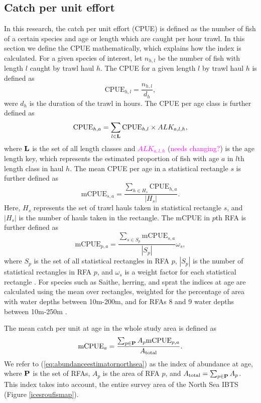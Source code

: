 \documentclass[a4paper 12pt]{article}
\numberwithin{equation}{section}
\newcommand{\natty}[1]{\textcolor{magenta}{#1}}
\begin{document}
\subsection{Catch per unit effort}
\label{sec:cpueestimators}
In this research, the catch per unit effort (CPUE) is defined as the number of fish of a certain species and age or length which are caught per hour trawl. In this section we define the CPUE mathematically, which explains how the index is calculated. For a given species of interest, let $n_{h,l}$ be the number of fish with length $l$ caught by trawl haul $h$. The CPUE for a given length $l$ by trawl haul $h$ is defined as 
\begin{equation}\label{eq:cpueHaul}
\mathrm{CPUE}_{h,l} =\frac{n_{h,l}}{d_h},
\end{equation}
were $d_h$ is the duration of the trawl in hours. The CPUE per age class is further defined as
\begin{equation}\label{eq:cpueALK}
\mathrm{CPUE}_{h,a} =\sum_{l \in {\bf L}}\mathrm{CPUE}_{h, l} \times ALK_{a,l,h},
\end{equation}
where ${\bf L}$ is the set of all length classes and \natty{$ALK_{a,l,h}$} (\natty{needs changing?}) is the age length key, which represents the estimated proportion of fish with age $a$ in $l$th length class in haul $h$. The mean CPUE per age in a statistical rectangle $s$ is further defined as
\begin{equation}\label{eq:cpueRec}
\mathrm{mCPUE}_{s,a} =\frac{\sum_{h \in H_{s}} \mathrm{CPUE}_{h,a}}{|H_{s}|}.
\end{equation}
Here, $H_{s}$ represents the set of trawl hauls taken in statistical rectangle $s$, and $|H_{s}|$ is the number of hauls taken in the rectangle. The mCPUE in $p$th RFA is further defined as
\begin{equation}\label{eq:cpueRFA}
\mathrm{mCPUE}_{p,a} = \frac{ \sum_{s \in S_{p}} \mathrm{mCPUE}_{s,a}}{|S_{p}|} \omega_s,
\end{equation}
where $S_{p}$ is the set of all statistical rectangles in RFA $p$, $|S_{p}|$ is the number of statistical rectangles in RFA $p$, and $\omega_s$ is a weight factor for each statistical rectangle \citep{ICES2013}. For species such as Saithe, herring, and sprat the indices at age are calculated using the mean over rectangles, weighted for the percentage of area with water depths between 10m-200m, and for RFAs 8 and 9 water depths between 10m-250m \citep{ICES2013}.

 The mean catch per unit at age in the whole study area is defined as
\begin{equation}
\text{mCPUE}_a= \frac{\sum_{p\in {\bf P}} A_{p}  \mathrm{mCPUE}_{p,a}}{A_{\text{total}}}.
\label{eq:abundanceestimatornorthsea}
\end{equation}
We refer to (\ref{eq:abundanceestimatornorthsea}) as the index of abundance at age, where ${\bf P}$ is the set of RFAs, $A_p$ is the area of RFA $p$, and $A_{\text{total}} = \sum_{p\in {\bf P}} A_{p}$. This index takes into account, the entire survey area of the North Sea IBTS (Figure \ref{icesroufismap}). 
\end{document}
